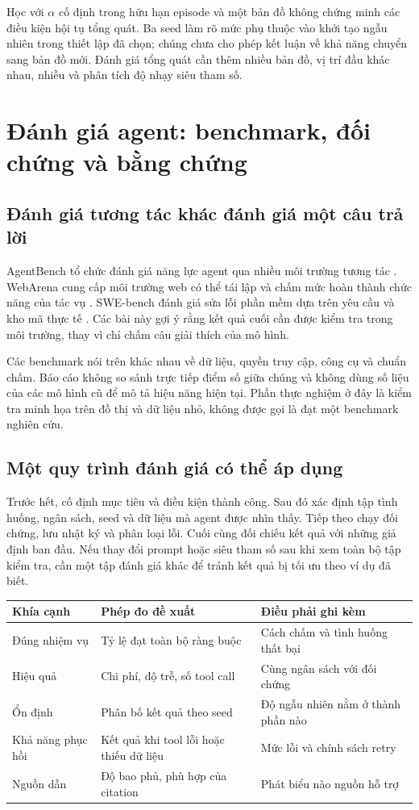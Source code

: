 Học với $\alpha$ cố định trong hữu hạn episode và một bản đồ không chứng minh các điều
kiện hội tụ tổng quát. Ba seed làm rõ mức phụ thuộc vào khởi tạo ngẫu nhiên trong
thiết lập đã chọn; chúng chưa cho phép kết luận về khả năng chuyển sang bản đồ mới.
Đánh giá tổng quát cần thêm nhiều bản đồ, vị trí đầu khác nhau, nhiễu và phân tích
độ nhạy siêu tham số.

\newpage
\section{Đánh giá agent: benchmark, đối chứng và bằng chứng}
\subsection{Đánh giá tương tác khác đánh giá một câu trả lời}
AgentBench tổ chức đánh giá năng lực agent qua nhiều môi trường tương tác
\cite{agentbench}. WebArena cung cấp môi trường web có thể tái lập và chấm mức hoàn
thành chức năng của tác vụ \cite{webarena}. SWE-bench đánh giá sửa lỗi phần mềm dựa
trên yêu cầu và kho mã thực tế \cite{swebench}. Các bài này gợi ý rằng kết quả cuối
cần được kiểm tra trong môi trường, thay vì chỉ chấm câu giải thích của mô hình.

Các benchmark nói trên khác nhau về dữ liệu, quyền truy cập, công cụ và chuẩn chấm.
Báo cáo không so sánh trực tiếp điểm số giữa chúng và không dùng số liệu của các mô
hình cũ để mô tả hiệu năng hiện tại. Phần thực nghiệm ở đây là kiểm tra minh họa trên
đồ thị và dữ liệu nhỏ, không được gọi là đạt một benchmark nghiên cứu.

\subsection{Một quy trình đánh giá có thể áp dụng}
Trước hết, cố định mục tiêu và điều kiện thành công. Sau đó xác định tập tình huống,
ngân sách, seed và dữ liệu mà agent được nhìn thấy. Tiếp theo chạy đối chứng, lưu
nhật ký và phân loại lỗi. Cuối cùng đối chiếu kết quả với những giả định ban đầu.
Nếu thay đổi prompt hoặc siêu tham số sau khi xem toàn bộ tập kiểm tra, cần một tập
đánh giá khác để tránh kết quả bị tối ưu theo ví dụ đã biết.

\begin{center}\small
\begin{tabularx}{\linewidth}{@{}p{3.0cm}XX@{}}\toprule
\textbf{Khía cạnh} & \textbf{Phép đo đề xuất} & \textbf{Điều phải ghi kèm}\\\midrule
Đúng nhiệm vụ & Tỷ lệ đạt toàn bộ ràng buộc & Cách chấm và tình huống thất bại\\
Hiệu quả & Chi phí, độ trễ, số tool call & Cùng ngân sách với đối chứng\\
Ổn định & Phân bố kết quả theo seed & Độ ngẫu nhiên nằm ở thành phần nào\\
Khả năng phục hồi & Kết quả khi tool lỗi hoặc thiếu dữ liệu & Mức lỗi và chính sách retry\\
Nguồn dẫn & Độ bao phủ, phù hợp của citation & Phát biểu nào nguồn hỗ trợ\\\bottomrule
\end{tabularx}\end{center}

